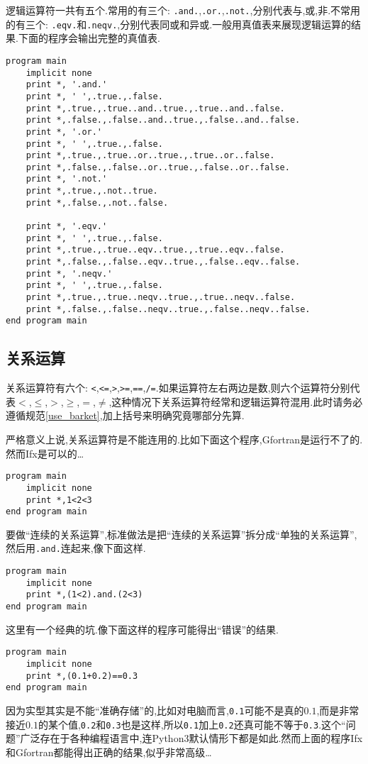 逻辑运算符一共有五个.常用的有三个: \texttt{.and.},\texttt{.or.},\texttt{.not.},分别代表与,或,非.不常用的有三个: \texttt{.eqv.}和\texttt{.neqv.},分别代表同或和异或.一般用真值表来展现逻辑运算的结果.下面的程序会输出完整的真值表.
\begin{lstlisting}
program main
    implicit none
    print *, '.and.'
    print *, ' ',.true.,.false.
    print *,.true.,.true..and..true.,.true..and..false.
    print *,.false.,.false..and..true.,.false..and..false.
    print *, '.or.'
    print *, ' ',.true.,.false.
    print *,.true.,.true..or..true.,.true..or..false.
    print *,.false.,.false..or..true.,.false..or..false.
    print *, '.not.'
    print *,.true.,.not..true.
    print *,.false.,.not..false.
  
    print *, '.eqv.'
    print *, ' ',.true.,.false.
    print *,.true.,.true..eqv..true.,.true..eqv..false.
    print *,.false.,.false..eqv..true.,.false..eqv..false.
    print *, '.neqv.'
    print *, ' ',.true.,.false.
    print *,.true.,.true..neqv..true.,.true..neqv..false.
    print *,.false.,.false..neqv..true.,.false..neqv..false.
end program main
\end{lstlisting}

\subsection{关系运算}

关系运算符有六个: \texttt{<},\texttt{<=},\texttt{>},\texttt{>=},\texttt{==},\texttt{/=}.如果运算符左右两边是数,则六个运算符分别代表$<$,$\leqslant$,$>$,$\geqslant$,$=$,$\ne$,这种情况下关系运算符经常和逻辑运算符混用.此时请务必遵循规范\ref{use_barket},加上括号来明确究竟哪部分先算.

严格意义上说,关系运算符是不能连用的.比如下面这个程序,Gfortran是运行不了的.然而Ifx是可以的\dots
\begin{lstlisting}
program main
    implicit none
    print *,1<2<3
end program main
\end{lstlisting}

要做``连续的关系运算'',标准做法是把``连续的关系运算''拆分成``单独的关系运算'',然后用\texttt{.and.}连起来,像下面这样.
\begin{lstlisting}
program main
    implicit none
    print *,(1<2).and.(2<3)
end program main
\end{lstlisting}

这里有一个经典的坑.像下面这样的程序可能得出``错误''的结果.
\begin{lstlisting}
program main
    implicit none
    print *,(0.1+0.2)==0.3
end program main
\end{lstlisting}
因为实型其实是不能``准确存储''的,比如对电脑而言,\texttt{0.1}可能不是真的$0.1$,而是非常接近$0.1$的某个值,\texttt{0.2}和\texttt{0.3}也是这样,所以\texttt{0.1}加上\texttt{0.2}还真可能不等于\texttt{0.3}.这个``问题''广泛存在于各种编程语言中,连Python3默认情形下都是如此.然而上面的程序Ifx和Gfortran都能得出正确的结果,似乎非常高级\dots

